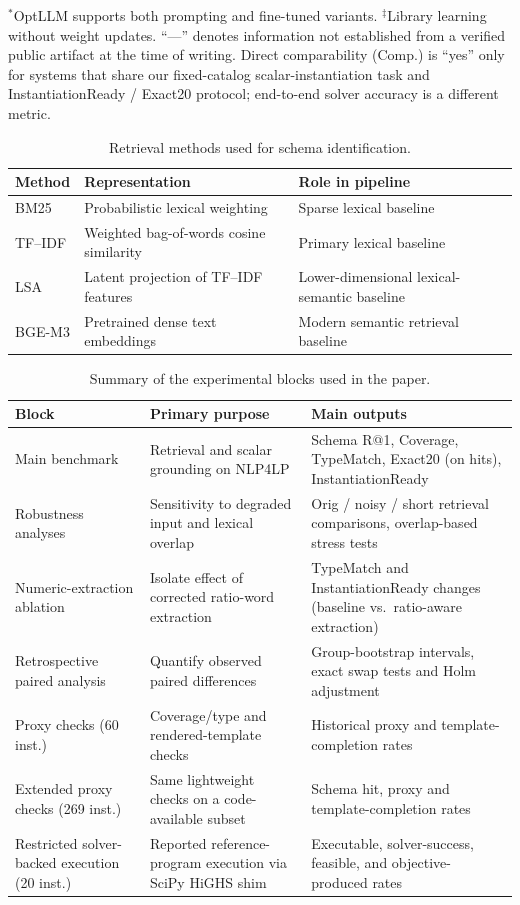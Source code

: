 \documentclass[pdflatex,sn-basic,Numbered]{sn-jnl}
\begin{document}
\begin{table}[htbp]
\vspace{1mm}
\raggedright
\small
$^{*}$OptLLM supports both prompting and fine-tuned variants.
$^{\ddagger}$Library learning without weight updates.
``---'' denotes information not established from a verified public artifact at the time of writing.
Direct comparability (Comp.) is ``yes'' only for systems that share our fixed-catalog scalar-instantiation
task and InstantiationReady / Exact20 protocol; end-to-end solver accuracy is a different metric.
\end{table}
\begin{table}[htbp]
\centering
\caption{Retrieval methods used for schema identification.}
\label{tab:retrieval_backbones}
\small
\begin{tabularx}{\linewidth}{@{}lXX@{}}
\toprule
Method & Representation & Role in pipeline \\
\midrule
BM25 & Probabilistic lexical weighting & Sparse lexical baseline \\
TF--IDF & Weighted bag-of-words cosine similarity & Primary lexical baseline \\
LSA & Latent projection of TF--IDF features & Lower-dimensional lexical-semantic baseline \\
BGE-M3 & Pretrained dense text embeddings & Modern semantic retrieval baseline \\
\bottomrule
\end{tabularx}
\end{table}
\begin{table}[htbp]
\centering
\caption{Summary of the experimental blocks used in the paper.}
\label{tab:exp_blocks}
\small
\begin{tabularx}{\linewidth}{X X X}
\toprule
Block & Primary purpose & Main outputs \\
\midrule
Main benchmark & Retrieval and scalar grounding on \textsc{NLP4LP} & Schema R@1, Coverage, TypeMatch, Exact20 (on hits), InstantiationReady \\
Robustness analyses & Sensitivity to degraded input and lexical overlap & Orig / noisy / short retrieval comparisons, overlap-based stress tests \\
Numeric-extraction ablation & Isolate effect of corrected ratio-word extraction & TypeMatch and InstantiationReady changes (baseline vs.\ ratio-aware extraction) \\
Retrospective paired analysis & Quantify observed paired differences & Group-bootstrap intervals, exact swap tests and Holm adjustment \\
Proxy checks (60 inst.) & Coverage/type and rendered-template checks & Historical proxy and template-completion rates \\
Extended proxy checks (269 inst.) & Same lightweight checks on a code-available subset & Schema hit, proxy and template-completion rates \\
Restricted solver-backed execution (20 inst.) & Reported reference-program execution via SciPy HiGHS shim & Executable, solver-success, feasible, and objective-produced rates \\
\bottomrule
\end{tabularx}
\end{table}
\FloatBarrier
\end{document}
